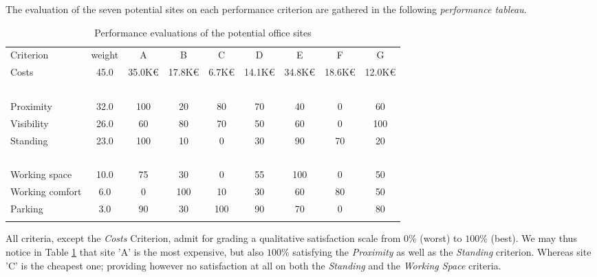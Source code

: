 The evaluation of the seven potential sites on each performance criterion are gathered in the following \emph{performance tableau}.
\begin{table}[h]
\caption{Performance evaluations of the potential office sites}
\label{tab:6.3}       %
\begin{center}
    \begin{tabular}{l|c|c|c|c|c|c|c|c}
      \svhline\noalign{\smallskip}
    Criterion  &   weight &  A  &      B &       C &       D &       E &        F &        G\\
       \noalign{\smallskip}\hline\noalign{\smallskip}

    Costs     &    45.0  &   35.0K€ &  17.8K€  & 6.7K€  &  14.1K€ &  34.8K€ &  18.6K€ &  12.0K€\\
    \      &        \    &   \      &  \     &   \     &   \    &    \    &    \    &    \ \\
    Proximity     &     32.0  &   100    &  20 &      80    &   70    &   40    &   0    &    60 \\
    Visibility     &     26.0  &   60     &  80  &     70    &   50    &   60    &   0    &    100 \\
    Standing     &     23.0  &   100   &   10   &    0     &   30    &   90    &   70   &    20 \\
    \        &      \    &   \     &   \    &    \     &   \     &   \     &   \    &    \  \\
    Working space     &     10.0  &   75    &   30   &    0     &   55    &   100   &   0    &    50  \\
    Working comfort     &      6.0  &   0     &   100  &    10    &   30    &   60    &   80   &    50 \\
    Parking     &      3.0  &   90    &   30   &    100   &   90    &   70    &   0    &    80 \\
      \noalign{\smallskip}\hline
    \end{tabular}
  \end{center}
\end{table}

All criteria, except the \emph{Costs} Criterion, admit for grading a qualitative satisfaction scale from $0\%$ (worst) to $100\%$ (best). We may thus notice in Table \ref{tab:6.3} that site 'A' is the most expensive, but also $100\%$ satisfying the \emph{Proximity} as well as the  \emph{Standing} criterion. Whereas site 'C' is the cheapest one; providing however no satisfaction at all on both the \emph{Standing} and the \emph{Working Space} criteria.

